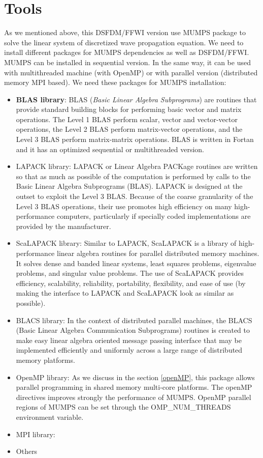 \section{Tools}
As we mentioned above, this DSFDM/FFWI version use MUMPS package to solve the linear system of discretized wave propagation equation. We need to install different packages for MUMPS dependencies as well as DSFDM/FFWI. MUMPS can be installed in sequential version. In the same way, it can be used with multithreaded machine (with OpenMP) or with parallel version (distributed memory MPI based). We need these packages for MUMPS installation:
\begin{itemize}
\item \textbf{BLAS library}: BLAS (\textit{Basic Linear Algebra Subprograms}) are routines that provide standard building blocks for performing basic vector and matrix operations. The Level 1 BLAS perform scalar, vector and vector-vector operations, the Level 2 BLAS perform matrix-vector operations, and the Level 3 BLAS perform matrix-matrix operations. BLAS is written in Fortan and it has an optimized sequential or multithreaded version.
\item LAPACK library: LAPACK or Linear Algebra PACKage routines are written so that as much as possible of the computation is performed by calls to the Basic Linear Algebra Subprograms (BLAS). LAPACK is designed at the outset to exploit the Level 3 BLAS. Because of the coarse granularity of the Level 3 BLAS operations, their use promotes high efficiency on many high-performance computers, particularly if specially coded implementations are provided by the manufacturer.
\item ScaLAPACK library: Similar to LAPACK, ScaLAPACK is a library of high-performance linear algebra routines for parallel distributed memory machines. It solves dense and banded linear systems, least squares problems, eigenvalue problems, and singular value problems. The use of ScaLAPACK provides efficiency, scalability, reliability, portability, flexibility, and ease of use (by making the interface to LAPACK and ScaLAPACK look as similar as possible). 
\item BLACS library: In the context of distributed parallel machines, the BLACS (Basic Linear Algebra Communication Subprograms) routines is created to make easy linear algebra oriented message passing interface that may be implemented efficiently and uniformly across a large range of distributed memory platforms.
\item OpenMP library: As we discuss in the section \ref{openMP}, this package allows parallel programming in  shared memory multi-core platforms. The openMP directives improves strongly the performance of MUMPS. OpenMP parallel regions of MUMPS can be set through the OMP\_NUM\_THREADS environment variable. 
\item MPI library: 
\item Others
\end{itemize}

